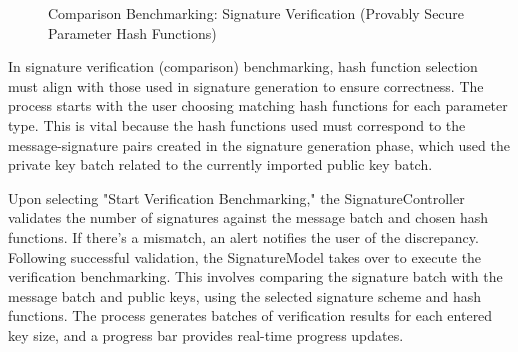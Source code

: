 \documentclass[]{final_report}
\theoremstyle{definition}
\begin{document}
\begin{figure}[H]
\begin{minipage}{0.49\textwidth}
        \caption{Comparison Benchmarking: Signature Verification (Provably Secure Parameter Hash Functions)}
        \label{fig:image2}
    \end{minipage}
\end{figure}


In signature verification (comparison) benchmarking, hash function selection must align with those used in signature generation to ensure correctness. The process starts with the user choosing matching hash functions for each parameter type. This is vital because the hash functions used must correspond to the message-signature pairs created in the signature generation phase, which used the private key batch related to the currently imported public key batch.

Upon selecting "Start Verification Benchmarking," the SignatureController validates the number of signatures against the message batch and chosen hash functions. If there's a mismatch, an alert notifies the user of the discrepancy. Following successful validation, the SignatureModel takes over to execute the verification benchmarking. This involves comparing the signature batch with the message batch and public keys, using the selected signature scheme and hash functions. The process generates batches of verification results for each entered key size, and a progress bar provides real-time progress updates.
\end{document}
